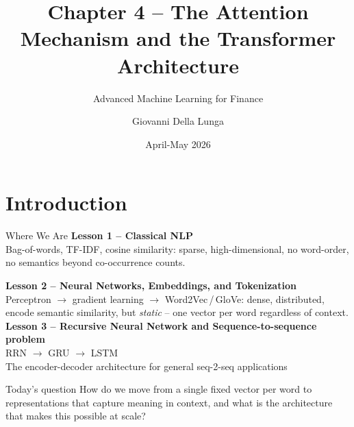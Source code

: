 \documentclass[aspectratio=169]{beamer}
\title{Chapter 4 -- The Attention Mechanism and the Transformer Architecture}
\subtitle{Advanced Machine Learning for Finance}
\author{Giovanni Della Lunga}
\institute{University of Bologna}
\date{April-May 2026}
\begin{document}
%
%
\begin{frame}
    \titlepage
\end{frame}
%
\section{Introduction}
%
\begin{frame}{Where We Are}
  \textbf{Lesson 1 – Classical NLP}\\[0.2em]
  Bag-of-words, TF-IDF, cosine similarity: sparse, high-dimensional, no word-order,
  no semantics beyond co-occurrence counts.

  \textbf{Lesson 2 – Neural Networks, Embeddings, and Tokenization}\\[0.2em]
  Perceptron $\to$ gradient learning $\to$ Word2Vec\,/\,GloVe: dense, distributed,
  encode semantic similarity, but \emph{static} – one vector per word regardless of
  context.\\

  \textbf{Lesson 3 – Recursive Neural Network and Sequence-to-sequence problem}\\[0.2em]
  RRN $\to$ GRU $\to$ LSTM \\
  The encoder-decoder architecture for general seq-2-seq applications\\


  \vspace{0.6em}
  \begin{alertblock}{Today's question}
    How do we move from a single fixed vector per word to representations that capture
    meaning in context, and what is the architecture that makes this possible at scale?
  \end{alertblock}
\end{frame}
%
%
\end{document}
